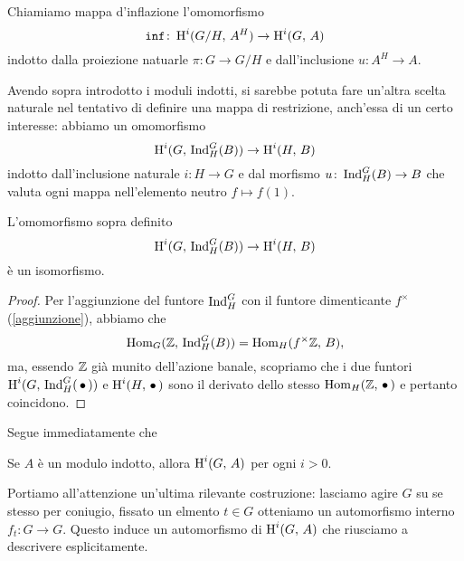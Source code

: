 \begin{definition}[Inflazione]
	Chiamiamo mappa d'inflazione l'omomorfismo
	\[ \operatorname{\mathtt{inf}} \colon \operatorname{H}^i(G/H, \, A^H) \to \operatorname{H}^i(G, \, A) \]
	indotto dalla proiezione natuarle $ \pi \colon G \to G/H $ e dall'inclusione $ u \colon A^H \to A $.
\end{definition}

Avendo sopra introdotto i moduli indotti, si sarebbe potuta fare un'altra scelta naturale nel tentativo di definire una mappa di restrizione, anch'essa di un certo interesse: abbiamo un omomorfismo \[ \operatorname{H}^i(G, \, \operatorname{Ind}_H^G(B)) \to \operatorname{H}^i(H, \, B) \] indotto dall'inclusione naturale $ i \colon H \to G $ e dal morfismo $ u \colon \operatorname{Ind}_H^G(B) \to B $ che valuta ogni mappa nell'elemento neutro $ f \mapsto f(1) $. 
\begin{proposition}
	L'omomorfismo sopra definito
	\[ \operatorname{H}^i(G, \, \operatorname{Ind}_H^G(B)) \to \operatorname{H}^i(H, \, B) \]
	è un isomorfismo.
\end{proposition}
\begin{proof}
	Per l'aggiunzione del funtore $ \operatorname{Ind}_H^G $ con il funtore dimenticante $ f^\times $ (\ref{aggiunzione}), abbiamo che
	\[ \operatorname{Hom}_G(\mathbb{Z},\, \operatorname{Ind}_H^G(B)) = \operatorname{Hom}_H(f^\times \mathbb{Z}, \, B), \]
	ma, essendo $ \mathbb{Z} $ già munito dell'azione banale, scopriamo che i due funtori $ \operatorname{H}^i(G, \, \operatorname{Ind}_H^G(\,\bullet\,)) $ e $ \operatorname{H}^i(H, \, \bullet\,) $ sono il derivato dello stesso $ \operatorname{Hom}_H(\mathbb{Z}, \,\bullet \,) $ e pertanto coincidono.
\end{proof}

Segue immediatamente che
\begin{corollary}
	Se $ A $ è un modulo indotto, allora $ \operatorname{H}^i(G, \, A) $ per ogni $ i > 0 $.
\end{corollary}

Portiamo all'attenzione un'ultima rilevante costruzione: lasciamo agire $ G $ su se stesso per coniugio, fissato un elmento $ t \in G $ otteniamo un automorfismo interno $ f_t \colon G \to G $. Questo induce un automorfismo di $ \operatorname{H}^i(G, \, A) $ che riusciamo a descrivere esplicitamente.

